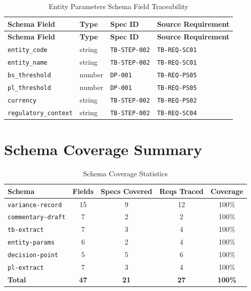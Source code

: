\documentclass[11pt,a4paper,twoside]{report}
\newcommand{\reqref}[1]{\texttt{#1}}
\newcommand{\specref}[1]{\texttt{#1}}
\newcommand{\schemaref}[1]{\texttt{#1}}
\newcommand{\fieldref}[1]{\textcolor{sapblue}{\texttt{#1}}}
\begin{document}
\begin{longtable}{@{}L{4cm}L{2.5cm}C{2cm}L{4.5cm}@{}}
\caption{Entity Parameters Schema Field Traceability}
\label{tab:entity-params-fields} \\
\toprule
\textbf{Schema Field} & \textbf{Type} & \textbf{Spec ID} & \textbf{Source Requirement} \\
\midrule
\endfirsthead
\toprule
\textbf{Schema Field} & \textbf{Type} & \textbf{Spec ID} & \textbf{Source Requirement} \\
\midrule
\endhead
\fieldref{entity\_code} & string & \specref{TB-STEP-002} & \reqref{TB-REQ-SC01} \\
\fieldref{entity\_name} & string & \specref{TB-STEP-002} & \reqref{TB-REQ-SC01} \\
\fieldref{bs\_threshold} & number & \specref{DP-001} & \reqref{TB-REQ-PS05} \\
\fieldref{pl\_threshold} & number & \specref{DP-001} & \reqref{TB-REQ-PS05} \\
\fieldref{currency} & string & \specref{TB-STEP-002} & \reqref{TB-REQ-PS02} \\
\fieldref{regulatory\_context} & string & \specref{TB-STEP-002} & \reqref{TB-REQ-SC04} \\
\bottomrule
\end{longtable}

\section{Schema Coverage Summary}
\label{sec:schema-coverage-summary}

\begin{table}[h]
\centering
\caption{Schema Coverage Statistics}
\label{tab:schema-coverage-stats}
\begin{tabular}{@{}lcccc@{}}
\toprule
\textbf{Schema} & \textbf{Fields} & \textbf{Specs Covered} & \textbf{Reqs Traced} & \textbf{Coverage} \\
\midrule
\schemaref{variance-record} & 15 & 9 & 12 & 100\% \\
\schemaref{commentary-draft} & 7 & 2 & 2 & 100\% \\
\schemaref{tb-extract} & 7 & 3 & 4 & 100\% \\
\schemaref{entity-params} & 6 & 2 & 4 & 100\% \\
\schemaref{decision-point} & 5 & 5 & 6 & 100\% \\
\schemaref{pl-extract} & 7 & 3 & 4 & 100\% \\
\midrule
\textbf{Total} & \textbf{47} & \textbf{21} & \textbf{27} & \textbf{100\%} \\
\bottomrule
\end{tabular}
\end{table}
\end{document}
